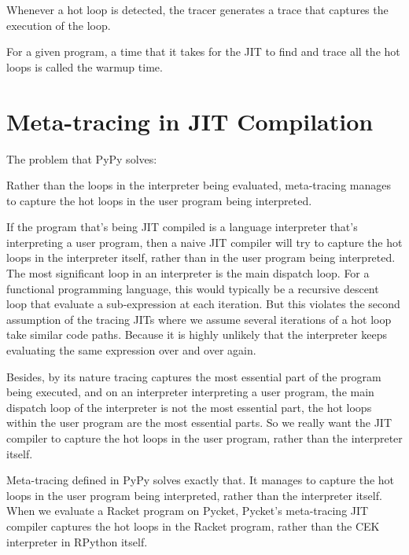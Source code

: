     \begin{paragraph-here}
        Whenever a hot loop is detected, the tracer generates a trace that captures the execution of the loop.

        For a given program, a time that it takes for the JIT to find and trace all the hot loops is called the warmup time.
    \end{paragraph-here}

    \section{Meta-tracing in JIT Compilation}
        \begin{mainpoint}
            The problem that PyPy solves:

            Rather than the loops in the interpreter being evaluated, meta-tracing manages to capture the hot loops in the user program being interpreted.
        \end{mainpoint}

        \begin{paragraph-here}
            If the program that's being JIT compiled is a language interpreter that's interpreting a user program, then a naive JIT compiler will try to capture the hot loops in the interpreter itself, rather than in the user program being interpreted. The most significant loop in an interpreter is the main dispatch loop. For a functional programming language, this would typically be a recursive descent loop that evaluate a sub-expression at each iteration. But this violates the second assumption of the tracing JITs where we assume several iterations of a hot loop take similar code paths. Because it is highly unlikely that the interpreter keeps evaluating the same expression over and over again.
        \end{paragraph-here}

        \begin{paragraph-here}
            Besides, by its nature tracing captures the most essential part of the program being executed, and on an interpreter interpreting a user program, the main dispatch loop of the interpreter is not the most essential part, the hot loops within the user program are the most essential parts. So we really want the JIT compiler to capture the hot loops in the user program, rather than the interpreter itself.
        \end{paragraph-here}

        \begin{paragraph-here}
            Meta-tracing defined in PyPy \cite{pypy-main} solves exactly that. It manages to capture the hot loops in the user program being interpreted, rather than the interpreter itself. When we evaluate a Racket program on Pycket, Pycket's meta-tracing JIT compiler captures the hot loops in the Racket program, rather than the CEK interpreter in RPython itself.
        \end{paragraph-here}

